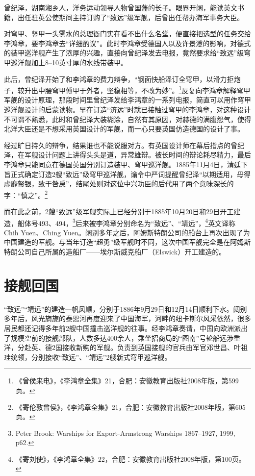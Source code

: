 \documentclass[12pt,UTF8]{ctexbook}
\begin{document}
曾纪泽，湖南湘乡人，洋务运动领导人物曾国藩的长子。眼界开阔，能读英文书籍，出任驻英公使期间主持订购了“致远”级军舰，后曾出任帮办海军事务大臣。

对穹甲、竖甲一头雾水的总理衙门实在看不出什么名堂，便直接把选型的任务交给李鸿章，要李鸿章去“详细酌议”。此时李鸿章受德国人以及许景澄的影响，对德式的装甲巡洋舰产生了浓厚的兴趣，直接向曾纪泽发去电报，竟然要求给“致远”级穹甲巡洋舰加上8--10英寸厚的水线带装甲。

此后，曾纪泽开始了和李鸿章的费力辩争，“钢面快船泽订全穹甲，以滑力拒炮子，较升出中腰穹甲傅甲于外者，坚稳相等，不改为妙”。\footnote{《曾侯来电》，《李鸿章全集》21，合肥：安徽教育出版社2008年版，第599页。}反复向李鸿章解释穹甲军舰的设计原理，那段时间里曾纪泽发给李鸿章的一系列电报，简直可以用作穹甲巡洋舰设计的启蒙读物。早在订造“济远”时就已接触过穹甲的李鸿章，对这种设计不可谓不熟悉，此时和曾纪泽大装糊涂，自然有其原因，对赫德的满腹怨气，使得北洋大臣还是不想采用英国设计的军舰，而一心只要英国仿造德国的设计了事。

经过旷日持久的辩争，结果谁也不能说服对方。有英国设计师在幕后指点的曾纪泽，在军舰设计问题上讲得头头是道，异常雄辩。被长时间的辩论耗尽精力，最后李鸿章只能同意在德国英国分别订造装甲、穹甲巡洋舰。1885年11月4日，清廷下旨正式确定订造2艘“致远”级穹甲巡洋舰，谕令中严词提醒曾纪泽“以期适用，毋得虚靡帑银，致干咎戾”，结尾处则对这位中兴功臣的后代用了两个意味深长的字：“慎之”。\footnote{《寄伦敦曾侯》，《李鸿章全集》21，合肥：安徽教育出版社2008年版，第605页。}

而在此之前，2艘“致远”级军舰实际上已经分别于1885年10月20日和29日开工建造，船体号493、494，\footnote{Peter Brook: Warships for Export-Armstrong Warships 1867--1927, 1999, p62.}后来被李鸿章分别命名为“致远”、“靖远”，\footnote{《寄刘使》，《李鸿章全集》22，合肥：安徽教育出版社2008年版，第100页。}英文译称 Chih Yuen、Ching Yuen。阔别多年之后，阿姆斯特朗公司的船台上再次出现了为中国建造的军舰。与当年订造“超勇”级军舰时不同，这次中国军舰完全是在阿姆斯特朗公司自己所属的造船厂——埃尔斯威克船厂（Elswick）开工建造的。

\section{接舰回国}

“致远”“靖远”的建造一帆风顺，分别于1886年9月29日和12月14日顺利下水。阔别多年后，风光旖旎的泰恩河再度迎来了中国海军，河畔的纽卡斯尔风采依然，很多居民都还记得多年前2艘中国撞击巡洋舰的往事。经李鸿章奏请，中国向欧洲派出了规模空前的接舰部队，人数多达400余人，乘坐招商局的“图南”号轮船远涉重洋，分赴英、德2国接收新购的军舰。负责到英国接舰的官兵由军官邓世昌、叶祖珪统领，分别接收“致远”、“靖远”2艘新式穹甲巡洋舰。
\end{document}
